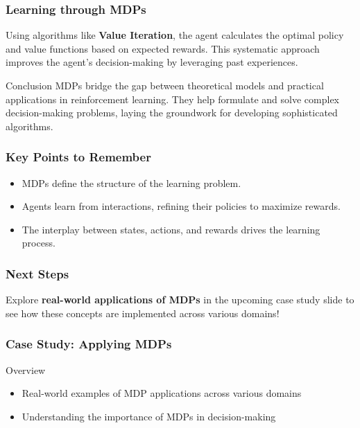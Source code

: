 \documentclass[aspectratio=169]{beamer}
\begin{document}
\begin{frame}[fragile]
    \frametitle{Learning through MDPs}
    Using algorithms like \textbf{Value Iteration}, the agent calculates the optimal policy and value functions based on expected rewards. This systematic approach improves the agent's decision-making by leveraging past experiences.

    \begin{block}{Conclusion}
        MDPs bridge the gap between theoretical models and practical applications in reinforcement learning. They help formulate and solve complex decision-making problems, laying the groundwork for developing sophisticated algorithms.
    \end{block}
\end{frame}

\begin{frame}[fragile]
    \frametitle{Key Points to Remember}
    \begin{itemize}
        \item MDPs define the structure of the learning problem.
        \item Agents learn from interactions, refining their policies to maximize rewards.
        \item The interplay between states, actions, and rewards drives the learning process.
    \end{itemize}
\end{frame}

\begin{frame}[fragile]
    \frametitle{Next Steps}
    Explore \textbf{real-world applications of MDPs} in the upcoming case study slide to see how these concepts are implemented across various domains!
\end{frame}

\begin{frame}[fragile]
  \frametitle{Case Study: Applying MDPs}
  \begin{block}{Overview}
    \begin{itemize}
      \item Real-world examples of MDP applications across various domains
      \item Understanding the importance of MDPs in decision-making
    \end{itemize}
  \end{block}
\end{frame}
\end{document}
